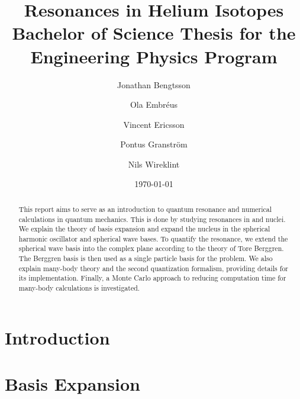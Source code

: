 \documentclass[12pt,a4paper]{report}
\begin{document}
  

\listoftodos


\title{Resonances in Helium Isotopes\\ 
\large Bachelor of Science Thesis for the Engineering Physics Program}
\author{Jonathan Bengtsson  \and Ola Embréus \and Vincent Ericsson \and Pontus Granström \and Nils Wireklint}
\date{\today}



\maketitle

\newpage
\begin{abstract}
This report aims to serve as an introduction to quantum resonance and 
numerical calculations in quantum mechanics. This is done by studying
resonances in  and  nuclei. We explain the theory of basis
expansion and expand the  nucleus in the spherical harmonic oscillator
and spherical wave bases. To quantify the  resonance, we extend the
spherical wave basis into the complex plane according to the 
theory of Tore Berggren. The Berggren basis is then used as a single particle
basis for the  problem. We also explain many-body theory and the second
quantization formalism, providing details for its implementation. Finally, a
Monte Carlo approach to reducing computation time for many-body 
calculations is investigated.

\end{abstract}
\newpage


\tableofcontents
\newpage

\setcounter{page}{1}

\chapter{Introduction}
\label{cha:introduction}



\chapter{Basis Expansion}
\label{cha:basis expansion}

\end{document}
